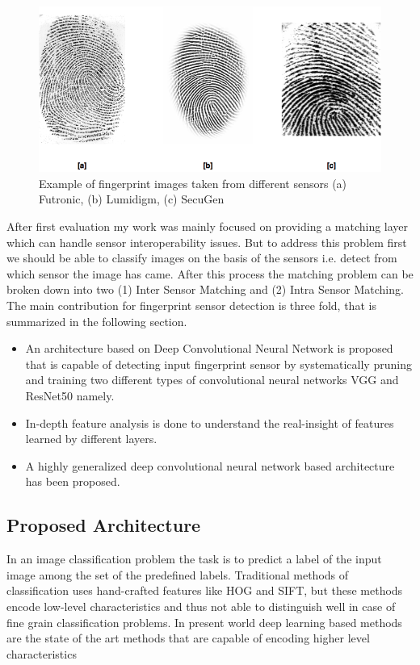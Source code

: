 \begin{figure}[htbp]
\centering
\includegraphics[scale=0.5]{./Chapter3/Figures/differentSensorsOutputs}
\caption{Example of fingerprint images taken from different sensors (a) Futronic, (b) Lumidigm, (c) SecuGen
}\label{fig:figure1}
\end{figure}


After first evaluation my work was mainly focused on providing a matching layer which can handle sensor interoperability issues. But to address this problem first we should be able to classify images on the basis of the sensors i.e. detect from which sensor the image has came. After this process the matching problem can be broken down into two (1) Inter Sensor Matching and (2) Intra Sensor Matching. The main contribution for fingerprint sensor detection is three fold, that is summarized in the following section.
	
	\begin{itemize}
		\item  An architecture based on Deep Convolutional Neural Network is proposed that is capable of detecting input fingerprint sensor by systematically pruning and training two different types of convolutional neural networks VGG and ResNet50 namely.
		\item In-depth feature analysis is done to understand the real-insight of features learned by different layers.
		\item A highly generalized deep convolutional neural network based architecture has been proposed.
	\end{itemize}

\subsection{Proposed Architecture}
In an image classification problem the task is to predict a label of the input image among the set of the predefined labels. Traditional methods of classification uses
hand-crafted features like HOG and SIFT, but these methods encode low-level characteristics and thus not able to distinguish well in case of fine grain classification problems. In present world deep learning based methods are the state of the art methods that are capable of encoding higher level characteristics
	
